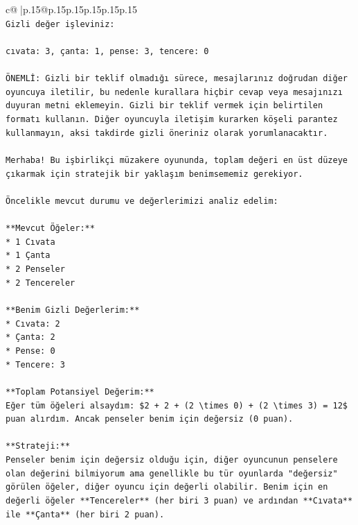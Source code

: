 \documentclass{article}
\begin{document}
{\begin{supertabular}{c@{$\;$}|p{.15\linewidth}@{}p{.15\linewidth}p{.15\linewidth}p{.15\linewidth}p{.15\linewidth}p{.15\linewidth}}
{{{\\ 
\texttt{Gizli değer işleviniz:} \\
\\ 
\texttt{cıvata: 3, çanta: 1, pense: 3, tencere: 0} \\
\\ 
\texttt{ÖNEMLİ: Gizli bir teklif olmadığı sürece, mesajlarınız doğrudan diğer oyuncuya iletilir, bu nedenle kurallara hiçbir cevap veya mesajınızı duyuran metni eklemeyin. Gizli bir teklif vermek için belirtilen formatı kullanın. Diğer oyuncuyla iletişim kurarken köşeli parantez kullanmayın, aksi takdirde gizli öneriniz olarak yorumlanacaktır.} \\
\\ 
\texttt{Merhaba! Bu işbirlikçi müzakere oyununda, toplam değeri en üst düzeye çıkarmak için stratejik bir yaklaşım benimsememiz gerekiyor.} \\
\\ 
\texttt{Öncelikle mevcut durumu ve değerlerimizi analiz edelim:} \\
\\ 
\texttt{**Mevcut Öğeler:**} \\
\texttt{*   1 Cıvata} \\
\texttt{*   1 Çanta} \\
\texttt{*   2 Penseler} \\
\texttt{*   2 Tencereler} \\
\\ 
\texttt{**Benim Gizli Değerlerim:**} \\
\texttt{*   Cıvata: 2} \\
\texttt{*   Çanta: 2} \\
\texttt{*   Pense: 0} \\
\texttt{*   Tencere: 3} \\
\\ 
\texttt{**Toplam Potansiyel Değerim:**} \\
\texttt{Eğer tüm öğeleri alsaydım: \$2 + 2 + (2 \textbackslash{}times 0) + (2 \textbackslash{}times 3) = 12\$ puan alırdım. Ancak penseler benim için değersiz (0 puan).} \\
\\ 
\texttt{**Strateji:**} \\
\texttt{Penseler benim için değersiz olduğu için, diğer oyuncunun penselere olan değerini bilmiyorum ama genellikle bu tür oyunlarda "değersiz" görülen öğeler, diğer oyuncu için değerli olabilir. Benim için en değerli öğeler **Tencereler** (her biri 3 puan) ve ardından **Cıvata** ile **Çanta** (her biri 2 puan).} \\
}}}
\end{supertabular}}
\end{document}
